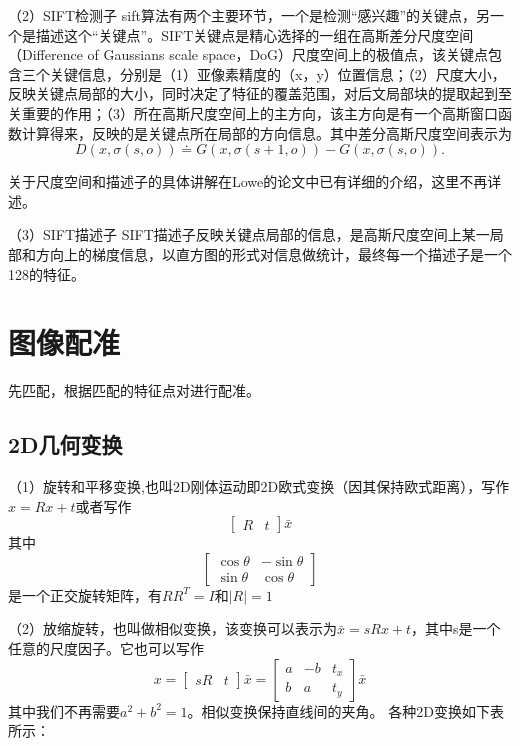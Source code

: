（2）SIFT检测子
sift算法有两个主要环节，一个是检测“感兴趣”的关键点，另一个是描述这个“关键点”。SIFT关键点是精心选择的一组在高斯差分尺度空间（Difference of Gaussians scale space，DoG）尺度空间上的极值点，该关键点包含三个关键信息，分别是（1）亚像素精度的（x，y）位置信息；（2）尺度大小，反映关键点局部的大小，同时决定了特征的覆盖范围，对后文局部块的提取起到至关重要的作用；（3）所在高斯尺度空间上的主方向，该主方向是有一个高斯窗口函数计算得来，反映的是关键点所在局部的方向信息。其中差分高斯尺度空间表示为
\begin{equation}
  D(x,\sigma(s,o)) \doteq G(x,\sigma(s+1,o)) - G(x,\sigma(s,o)).
\end{equation}

关于尺度空间和描述子的具体讲解在Lowe的论文中\cite{Lowe:2004uq}已有详细的介绍，这里不再详述。

（3）SIFT描述子
SIFT描述子反映关键点局部的信息，是高斯尺度空间上某一局部和方向上的梯度信息，以直方图的形式对信息做统计，最终每一个描述子是一个128的特征。


\section{图像配准}

先匹配，根据匹配的特征点对进行配准。

\subsection{2D几何变换}

（1）旋转和平移变换,也叫2D刚体运动即2D欧式变换（因其保持欧式距离），写作\(x={Rx+t}\)或者写作
\begin{equation}
	\begin{bmatrix}
	R & t
	\end{bmatrix}
	\bar{x}
\end{equation}
其中
\begin{equation}
	\begin{bmatrix}
	\cos{\theta} & -\sin{\theta} \\
	\sin{\theta} & \cos{\theta}
	\end{bmatrix}
\end{equation}
是一个正交旋转矩阵，有\(RR^T = I\)和\(|R| = 1\)

（2）放缩旋转，也叫做相似变换，该变换可以表示为\({\bar{x}}={sRx+t}\)，其中s是一个任意的尺度因子。它也可以写作
\begin{equation}
	x ={ 
	\begin{bmatrix}
	sR & t
	\end{bmatrix}
	\bar{x}
	}
	={
	\begin{bmatrix}
	a & -b & t_x \\
	b & a & t_y
	\end{bmatrix}
	\bar{x}
	}
\end{equation}
其中我们不再需要\(a^2 + b^2 = 1\)。相似变换保持直线间的夹角。
各种2D变换如下表所示：

